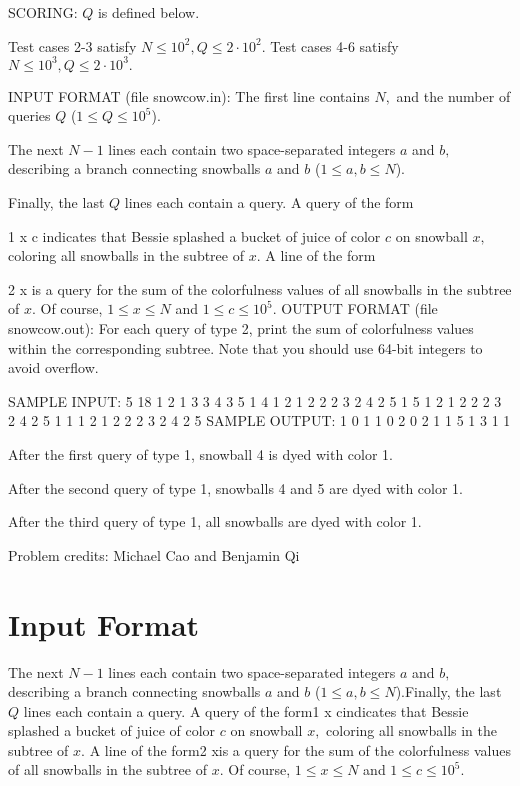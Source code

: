 \documentclass[12pt]{article}
\begin{document}
SCORING:
$Q$ is defined below.

Test cases 2-3 satisfy $N\le 10^2, Q\le 2\cdot 10^2.$ Test cases 4-6 satisfy $N\le 10^3, Q\le 2\cdot 10^3.$ 

INPUT FORMAT (file snowcow.in):
The first line contains $N,$ and the number of queries $Q$ ($1\le Q\le 10^5$). 

The next $N-1$ lines each contain two space-separated integers $a$ and $b,$
describing a branch connecting snowballs $a$ and $b$ ($1 \le a, b \le N$).

Finally, the last $Q$ lines each contain a query.  A query of the form

1 x c
indicates that Bessie splashed a bucket of juice of color $c$ on snowball $x,$
coloring all snowballs in the subtree of $x$. A line of the form 

2 x
is a query for the sum of the colorfulness values of all snowballs in the
subtree of $x$. Of course, $1\le x\le N$ and $1\le c\le 10^5.$ 
OUTPUT FORMAT (file snowcow.out):
For each query of type 2, print the sum of colorfulness values within 
the corresponding subtree. 
Note that you should use 64-bit integers to avoid overflow. 

SAMPLE INPUT:
5 18
1 2
1 3
3 4
3 5
1 4 1
2 1
2 2
2 3
2 4
2 5
1 5 1
2 1
2 2
2 3
2 4
2 5
1 1 1
2 1
2 2
2 3
2 4
2 5
SAMPLE OUTPUT: 
1
0
1
1
0
2
0
2
1
1
5
1
3
1
1

After the first query of type 1, snowball 4 is dyed with color 1.

After the second query of type 1, snowballs 4 and 5 are dyed with color 1.

After the third query of type 1, all snowballs are dyed with color 1.


Problem credits: Michael Cao and Benjamin Qi



\section*{Input Format}
The next $N-1$ lines each contain two space-separated integers $a$ and $b,$
describing a branch connecting snowballs $a$ and $b$ ($1 \le a, b \le N$).Finally, the last $Q$ lines each contain a query.  A query of the form1 x cindicates that Bessie splashed a bucket of juice of color $c$ on snowball $x,$
coloring all snowballs in the subtree of $x$. A line of the form2 xis a query for the sum of the colorfulness values of all snowballs in the
subtree of $x$. Of course, $1\le x\le N$ and $1\le c\le 10^5.$
\end{document}
